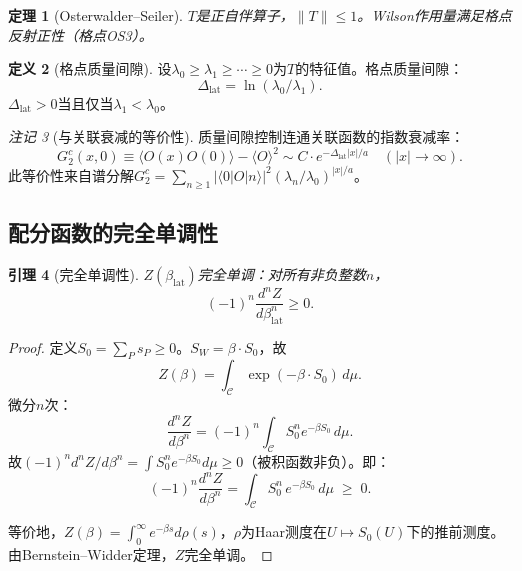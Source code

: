 \documentclass[12pt,a4paper]{article}
\theoremstyle{plain}
\newtheorem{theorem}{定理}[section]
\newtheorem{lemma}[theorem]{引理}
\theoremstyle{definition}
\newtheorem{definition}[theorem]{定义}
\theoremstyle{remark}
\newtheorem{remark}[theorem]{注记}
\begin{document}
\begin{theorem}[Osterwalder--Seiler\cite{OsterwalderSeiler1978}]\label{thm:OS}
$T$是正自伴算子，$\|T\|\leq 1$。Wilson作用量满足格点反射正性（格点OS3）。
\end{theorem}

\begin{definition}[格点质量间隙]\label{def:gap}
设$\lambda_0\geq\lambda_1\geq\cdots\geq 0$为$T$的特征值。格点质量间隙：
\begin{equation}\label{eq:gapdef}
\Delta_{\mathrm{lat}} = \ln(\lambda_0/\lambda_1).
\end{equation}
$\Delta_{\mathrm{lat}}>0$当且仅当$\lambda_1<\lambda_0$。
\end{definition}

\begin{remark}[与关联衰减的等价性]
质量间隙控制连通关联函数的指数衰减率：
\begin{equation}\label{eq:expdecay}
G_2^c(x,0) \equiv \langle O(x)O(0)\rangle - \langle O\rangle^2 \sim C\cdot e^{-\Delta_{\mathrm{lat}}|x|/a} \quad (|x|\to\infty).
\end{equation}
此等价性来自谱分解$G_2^c=\sum_{n\geq 1}|\langle 0|O|n\rangle|^2(\lambda_n/\lambda_0)^{|x|/a}$。
\end{remark}

\subsection{配分函数的完全单调性}\label{sec:cm}

\begin{lemma}[完全单调性]\label{lem:cm}
$Z(\beta_{\mathrm{lat}})$完全单调：对所有非负整数$n$，
\begin{equation}\label{eq:cm}
(-1)^n \frac{d^nZ}{d\beta_{\mathrm{lat}}^n} \geq 0.
\end{equation}
\end{lemma}

\begin{proof}
定义$S_0=\sum_P s_P\geq 0$。$S_W=\beta\cdot S_0$，故
\begin{equation}\label{eq:Zlaplace}
Z(\beta) = \int_{\mathcal{C}} \exp(-\beta\cdot S_0)\,d\mu.
\end{equation}
微分$n$次：
\begin{equation}\label{eq:cmderiv}
\frac{d^nZ}{d\beta^n} = (-1)^n\int_{\mathcal{C}} S_0^n e^{-\beta S_0}\,d\mu.
\end{equation}
故$(-1)^n d^nZ/d\beta^n = \int S_0^n e^{-\beta S_0}d\mu \geq 0$（被积函数非负）。即：
\begin{equation}
(-1)^n\frac{d^nZ}{d\beta^n} = \int_{\mathcal{C}} S_0^n\,e^{-\beta S_0}\,d\mu \;\geq\; 0.
\end{equation}

等价地，$Z(\beta)=\int_0^\infty e^{-\beta s}d\rho(s)$，$\rho$为Haar测度在$U\mapsto S_0(U)$下的推前测度。由Bernstein--Widder定理\cite{Bernstein1929,Widder1941}，$Z$完全单调。
\end{proof}
\end{document}
